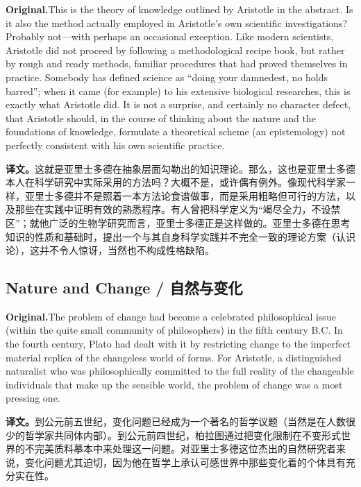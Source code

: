 \documentclass[UTF8]{ctexart}
\newcommand{\orig}{\par\noindent\textbf{Original.}\quad}
\newcommand{\zh}{\par\noindent\textbf{译文。}\quad}
\begin{document}
\orig This is the theory of knowledge outlined by Aristotle in the abstract. Is it also the method actually employed in Aristotle's own scientific investigations? Probably not---with perhaps an occasional exception. Like modern scientists, Aristotle did not proceed by following a methodological recipe book, but rather by rough and ready methods, familiar procedures that had proved themselves in practice. Somebody has defined science as ``doing your damnedest, no holds barred''; when it came (for example) to his extensive biological researches, this is exactly what Aristotle did. It is not a surprise, and certainly no character defect, that Aristotle should, in the course of thinking about the nature and the foundations of knowledge, formulate a theoretical scheme (an epistemology) not perfectly consistent with his own scientific practice.

\zh 这就是亚里士多德在抽象层面勾勒出的知识理论。那么，这也是亚里士多德本人在科学研究中实际采用的方法吗？大概不是，或许偶有例外。像现代科学家一样，亚里士多德并不是照着一本方法论食谱做事，而是采用粗略但可行的方法，以及那些在实践中证明有效的熟悉程序。有人曾把科学定义为“竭尽全力，不设禁区”；就他广泛的生物学研究而言，亚里士多德正是这样做的。亚里士多德在思考知识的性质和基础时，提出一个与其自身科学实践并不完全一致的理论方案（认识论），这并不令人惊讶，当然也不构成性格缺陷。

\subsection*{Nature and Change / 自然与变化}

\orig The problem of change had become a celebrated philosophical issue (within the quite small community of philosophers) in the fifth century B.C. In the fourth century, Plato had dealt with it by restricting change to the imperfect material replica of the changeless world of forms. For Aristotle, a distinguished naturalist who was philosophically committed to the full reality of the changeable individuals that make up the sensible world, the problem of change was a most pressing one.

\zh 到公元前五世纪，变化问题已经成为一个著名的哲学议题（当然是在人数很少的哲学家共同体内部）。到公元前四世纪，柏拉图通过把变化限制在不变形式世界的不完美质料摹本中来处理这一问题。对亚里士多德这位杰出的自然研究者来说，变化问题尤其迫切，因为他在哲学上承认可感世界中那些变化着的个体具有充分实在性。
\end{document}
